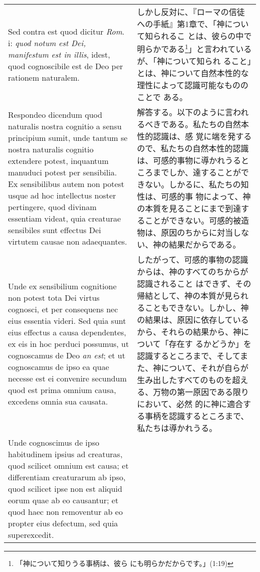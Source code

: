 \documentclass[10pt]{jsarticle} %
\begin{document}
\begin{longtable}{p{21em}p{21em}}
{\sc Sed contra est} quod dicitur {\it Rom}. {\sc i}: {\it quod notum
est Dei, manifestum est in illis}, idest, quod cognoscibile est de Deo
per rationem naturalem.

&

しかし反対に、『ローマの信徒への手紙』第1章で、「神について知られるこ
とは、彼らの中で明らかである\footnote{「神について知りうる事柄は、彼ら
にも明らかだからです。」(1:19)}」と言われているが、「神について知られ
ること」とは、神について自然本性的な理性によって認識可能なもののことで
ある。

\\

{\sc Respondeo dicendum} quod naturalis nostra cognitio a sensu
principium sumit, unde tantum se nostra naturalis cognitio extendere
potest, inquantum manuduci potest per sensibilia. Ex sensibilibus
autem non potest usque ad hoc intellectus noster pertingere, quod
divinam essentiam videat, quia creaturae sensibiles sunt effectus Dei
virtutem causae non adaequantes. 

&

解答する。以下のように言われるべきである。私たちの自然本性的認識は、感
覚に端を発するので、私たちの自然本性的認識は、可感的事物に導かれうると
ころまでしか、達することができない。しかるに、私たちの知性は、可感的事
物によって、神の本質を見ることにまで到達することができない。可感的被造
物は、原因のちからに対当しない、神の結果だからである。

\\

Unde ex sensibilium cognitione non potest tota Dei virtus cognosci, et
per consequens nec eius essentia videri. Sed quia sunt eius effectus a
causa dependentes, ex eis in hoc perduci possumus, ut cognoscamus de
Deo {\it an est}; et ut cognoscamus de ipso ea quae necesse est ei
convenire secundum quod est prima omnium causa, excedens omnia sua
causata.

&

したがって、可感的事物の認識からは、神のすべてのちからが認識されること
はできず、その帰結として、神の本質が見られることもできない。しかし、神
の結果は、原因に依存しているから、それらの結果から、神について「存在す
るかどうか」を認識するところまで、そしてまた、神について、それが自らが
生み出したすべてのものを超える、万物の第一原因である限りにおいて、必然
的に神に適合する事柄を認識するところまで、私たちは導かれうる。

\\

Unde cognoscimus de ipso habitudinem ipsius ad creaturas, quod
scilicet omnium est causa; et differentiam creaturarum ab ipso, quod
scilicet ipse non est aliquid eorum quae ab eo causantur; et quod haec
non removentur ab eo propter eius defectum, sed quia superexcedit.


\end{longtable}
\end{document}
